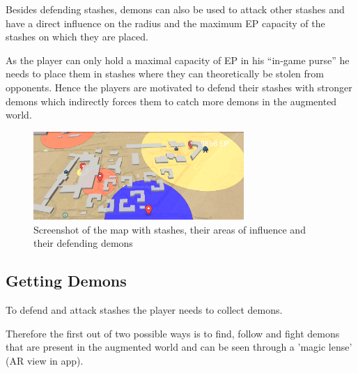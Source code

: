 Besides defending stashes, demons can also be used to attack other stashes and have a direct influence on the radius and the maximum EP capacity of the stashes on which they are placed.

As the player can only hold a maximal capacity of EP in his \enquote{in-game purse} he needs to place them in stashes where they can theoretically be stolen from opponents. 
Hence the players are motivated to defend their stashes with stronger demons which indirectly forces them to catch more demons in the augmented world.

\begin{figure}
    \includegraphics[width=8cm]{graphics/map.png}
    \caption{Screenshot of the map with stashes, their areas of influence and their defending demons}
    \label{fig:map}
\end{figure}




\subsection{Getting Demons}
\label{subsec:demons}

To defend and attack stashes the player needs to collect demons.

Therefore the first out of two possible ways is to find, follow and fight demons that are present in the augmented world and can be seen through a 'magic lense' (AR view in app).

